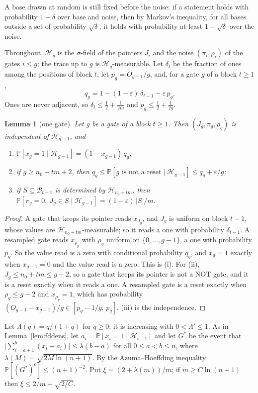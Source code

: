 \documentclass[11pt]{amsart}
\newtheorem{lemma}[theorem]{Lemma}
\theoremstyle{definition}
\theoremstyle{remark}
\newcommand{\eps}{\varepsilon}
\newcommand{\PP}{\mathbb{P}}
\begin{document}
\noindent A base drawn at random is still fixed before the noise: if a statement holds with probability
$1-\delta$ over base and noise, then by Markov's inequality, for all bases outside a set of
probability $\sqrt\delta$, it holds with probability at least $1-\sqrt\delta$ over the noise.

Throughout, $\mathcal H_g$ is the $\sigma$-field of the pointers $J_i$ and the noise
$(\pi_i,\rho_i)$ of the gates $i\le g$; the trace up to $g$ is $\mathcal H_g$-measurable. Let
$\delta_t$ be the fraction of ones among the positions of block $t$, let $p_g=O_{g-1}/g$, and, for a
gate $g$ of a block $t\ge1$,
\[
q_g=1-(1-\eps)\,\delta_{t-1}-\eps\,p_g .
\]
Ones are never adjacent, so $\delta_t\le\frac12+\frac1{2m}$ and $p_g\le\frac12+\frac1{2g}$.

\begin{lemma}[one gate]\label{lem:blockgate}
Let $g$ be a gate of a block $t\ge1$. Then $(J_g,\pi_g,\rho_g)$ is independent of
$\mathcal H_{g-1}$, and
\begin{enumerate}[label=(\roman*),leftmargin=2.4em]
\item $\PP[x_g=1\mid\mathcal H_{g-1}]=(1-x_{g-1})\,q_g$;
\item if $g\ge n_0+tm+2$, then $q_g\le\PP[g\text{ is not a reset}\mid\mathcal H_{g-1}]\le q_g+\eps/g$;
\item if $S\subseteq\mathcal B_{t-1}$ is determined by $\mathcal H_{n_0+tm}$, then
$\PP[\pi_g=0,\ J_g\in S\mid\mathcal H_{g-1}]=(1-\eps)\,|S|/m$.
\end{enumerate}
\end{lemma}

\begin{proof}
A gate that keeps its pointer reads $x_{J_g}$, and $J_g$ is uniform on block $t-1$, whose values
are $\mathcal H_{n_0+tm}$-measurable; so it reads a one with probability $\delta_{t-1}$. A resampled
gate reads $x_{\rho_g}$ with $\rho_g$ uniform on $\{0,\dots,g-1\}$, a one with probability $p_g$.
So the value read is a zero with conditional probability $q_g$, and $x_g=1$ exactly when
$x_{g-1}=0$ and the value read is a zero. This is (i). For (ii), $J_g\le n_0+tm\le g-2$, so a gate
that keeps its pointer is not a NOT gate, and it is a reset exactly when it reads a one. A
resampled gate is a reset exactly when $\rho_g\le g-2$ and $x_{\rho_g}=1$, which has probability
$(O_{g-1}-x_{g-1})/g\in[p_g-1/g,\,p_g]$. (iii) is the independence.
\end{proof}

Let $\Lambda(q)=q/(1+q)$ for $q\ge0$; it is increasing with $0<\Lambda'\le1$. As in
Lemma~\ref{lem:fddens}, let $a_i=\PP[x_i=1\mid\mathcal H_{i-1}]$ and let $G^*$ be the event that
$\bigl|\sum_{i=a+1}^{b}(x_i-a_i)\bigr|\le\lambda(b-a)$ for all $0\le a<b\le n$, where
$\lambda(M)=\sqrt{2M\ln(n+1)}$. By the Azuma--Hoeffding inequality $\PP[(G^*)^c]\le(n+1)^{-2}$. Put
$\xi=(2+\lambda(m))/m$; if $m\ge C\ln(n+1)$ then $\xi\le2/m+\sqrt{2/C}$.
\end{document}
